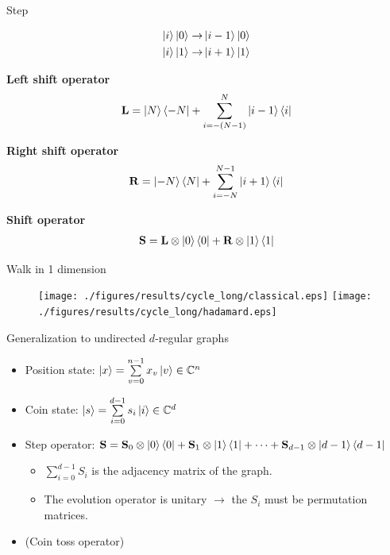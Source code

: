 \documentclass[aspectratio=169]{beamer}
\begin{document}
\begin{frame}{Step}

\vspace{-1.5cm}
\begin{align*}
\ket{i}\ket{0} \rightarrow& \ket{i-1}\ket{0} \\
\ket{i}\ket{1} \rightarrow& \ket{i+1}\ket{1}
\end{align*}

\pause

\textbf{Left shift operator}
\vspace{-0.5cm}
\begin{align*}
\mathbf{L} = \ket{N}\bra{-N} + \sum\limits_{i=-(N-1)}^{N} \ket{i-1}\bra{i}
\end{align*}

\pause

\textbf{Right shift operator}
\vspace{-0.5cm}
\begin{align*}
\mathbf{R} = \ket{-N}\bra{N} + \sum\limits_{i=-N}^{N-1} \ket{i+1}\bra{i} 
\end{align*}

\pause

\textbf{Shift operator}
\vspace{-0.5cm}
\begin{align*}
  \mathbf{S} = \mathbf{L}\otimes\ket{0}\bra{0} + \mathbf{R}\otimes\ket{1}\bra{1}
\end{align*}

\end{frame}

\begin{frame}{Walk in 1 dimension}
\begin{figure}[H]
  \centering
  \texttt{[image: ./figures/results/cycle\_long/classical.eps]}
  \texttt{[image: ./figures/results/cycle\_long/hadamard.eps]}
\end{figure}
\end{frame}

\begin{frame}{Generalization to undirected $d$-regular graphs}
\begin{itemize}
    \item Position state: $\ket{x} = \sum\limits_{v=0}^{n-1}x_v\ket{v} \in{} \mathbb{C}^{n}$ \pause
    \item Coin state: $\ket{s} = \sum\limits_{i=0}^{d-1}s_i\ket{i} \in{} \mathbb{C}^{d}$ \pause
    \item Step operator: $\mathbf{S} = \mathbf{S}_0\otimes \ket{0}\bra{0} + \mathbf{S}_1 \otimes\ket{1}\bra{1} + \dots + \mathbf{S}_{d-1}\otimes \ket{d-1}\bra{d-1}$
    \begin{itemize}
        \item $\sum\limits_{i=0}^{d-1}S_i$ is the adjacency matrix of the graph.
        \item The evolution operator is unitary $\rightarrow$ the $S_i$ must be permutation matrices.\pause
    \end{itemize}
    \item (Coin toss operator)
\end{itemize}
\end{frame}
\end{document}
